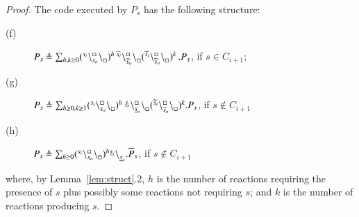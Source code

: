 \begin{proof}
\noindent
The code executed by  $P_s$ has the following structure:
\begin{description}
\item[(f)] 
$P_s \triangleq  \sum_{h,k\geq0}({}^{s_i}_{}\backslash_{s_o}^{\scriptstyle {\square}}\backslash_{\scriptstyle {\square}}^{}) ^h\, {}^{\widehat{s}_i}_{}\backslash_{\widehat{s}_o}^{\scriptstyle {\square}}\backslash_{\scriptstyle {\square}}^{}
 ({}^{\widetilde{s}_i}_{}\backslash_{\widetilde{s}_o}^{\scriptstyle {\square}}\backslash_{\scriptstyle {\square}}^{})^k\,.P_s $, if $s \in C_{i+1}$;
\item[(g)] 
$P_s \triangleq \sum_{h \geq 0,k\geq 1}({}^{s_i}_{}\backslash_{s_o}^{\scriptstyle {\square}}\backslash_{\scriptstyle {\square}}^{})^h\ {}^{\underline{s}_i}_{}\backslash_{\underline{s}_o}^{\scriptstyle {\square}}\backslash_{\scriptstyle {\square}}^{} ({}^{\widetilde{s}_i}_{}\backslash_{\widetilde{s}_o}^{\scriptstyle {\square}}\backslash_{\scriptstyle {\square}}^{})^k
.P_s$, if $s \not\in C_{i+1}$
\item[(h)] 
$P_s \triangleq  \sum_{h\geq0} ({}^{s_i}_{}\backslash_{s_o}^{\scriptstyle {\square}}\backslash_{\scriptstyle {\square}}^{})^h
{}^{\underline{s}_i} \backslash_{\underline{s}_o}^{}.\overline{P}_s$, if $s \notin C_{i+1}$
\end{description}
where, by Lemma~\ref{lem:struct}.2, $h$ is the number of reactions requiring the presence of $s$ plus possibly some reactions not requiring $s$; and $k$ is the number of reactions producing $s$.


\end{proof}
